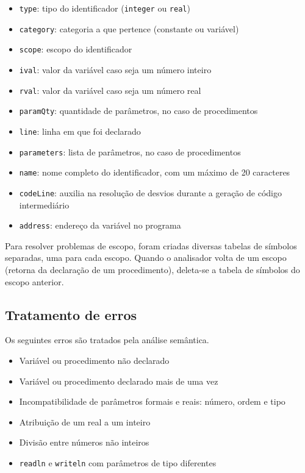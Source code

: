 \documentclass{article}
\begin{document}
		\begin{itemize}
			\item \verb=type=: tipo do identificador (\verb=integer= ou \verb=real=)
			\item \verb=category=: categoria a que pertence (constante ou variável)
			\item \verb=scope=: escopo do identificador
			\item \verb=ival=: valor da variável caso seja um número inteiro
			\item \verb=rval=: valor da variável caso seja um número real
			\item \verb=paramQty=: quantidade de parâmetros, no caso de procedimentos
			\item \verb=line=: linha em que foi declarado
			\item \verb=parameters=: lista de parâmetros, no caso de procedimentos
			\item \verb=name=: nome completo do identificador, com um máximo de 20 caracteres
			\item \verb=codeLine=: auxilia na resolução de desvios durante a geração de código intermediário
			\item \verb=address=: endereço da variável no programa
		\end{itemize}

	Para resolver problemas de escopo, foram criadas diversas tabelas de símbolos separadas, uma para cada escopo. Quando o analisador volta de um escopo (retorna da declaração de um procedimento), deleta-se a tabela de símbolos do escopo anterior. 

	\subsection{Tratamento de erros} %
	\label{ssub:tratamento_de_erros}
		Os seguintes erros são tratados pela análise semântica.

		\begin{itemize}
			\item Variável ou procedimento não declarado
			\item Variável ou procedimento declarado mais de uma vez
			\item Incompatibilidade de parâmetros formais e reais: número, ordem e tipo
			\item Atribuição de um real a um inteiro
			\item Divisão entre números não inteiros
			\item \verb=readln= e \verb=writeln= com parâmetros de tipo diferentes
		\end{itemize}
	
\end{document}
